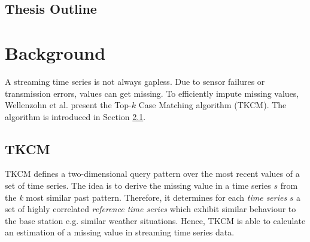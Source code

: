 \documentclass[abstracton,12pt]{scrreprt}
\begin{document}
\section{Thesis Outline}


\newtheorem{defn}{Definition}[section]
\newtheorem{exmp}{Example}[section]
\newcommand*{\argmin}{\operatornamewithlimits{argmin}\limits}

\chapter{Background}
\label{background}
A streaming time series is not always gapless. Due to sensor failures or transmission errors, values can get missing. To efficiently impute missing values, Wellenzohn et al.\cite{BScT} present the Top-$k$ Case Matching algorithm (TKCM). The algorithm is introduced in Section \ref{TKCM}.

\section{TKCM}
\label{TKCM}
TKCM defines a two-dimensional query pattern over the most recent values of a set of time series. 
The idea is to derive the missing value in a time series $s$ from the \emph{k} most similar past pattern. Therefore, it determines for each \emph{time series} $s$ a set of highly correlated \emph{reference time series} which exhibit similar behaviour to the base station e.g. similar weather situations. Hence, TKCM is able to calculate an estimation of a missing value in streaming time series data. 
\end{document}

